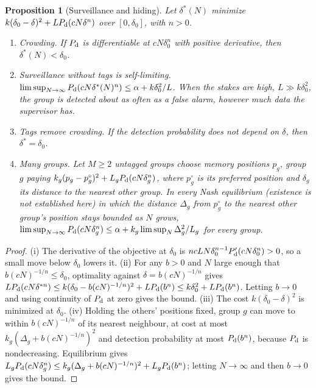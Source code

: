 \documentclass[12pt]{article}
\newtheorem{proposition}[theorem]{Proposition}
\theoremstyle{definition}
\theoremstyle{remark}
\begin{document}
\begin{proposition}[Surveillance and hiding]\label{prop:hidegame}
Let $\delta^*(N)$ minimize $k(\delta_0-\delta)^2+LP_{\rm d}(cN\delta^n)$ over $[0,\delta_0]$, with $n>0$.
\begin{enumerate}[label=(\roman*),itemsep=1pt]
\item \emph{Crowding.} If $P_{\rm d}$ is differentiable at $cN\delta_0^n$ with positive derivative, then $\delta^*(N)<\delta_0$.
\item \emph{Surveillance without tags is self-limiting.} $\limsup_{N\to\infty}P_{\rm d}(cN\delta^*(N)^n)\le\alpha+k\delta_0^2/L$. When the stakes are high, $L\gg k\delta_0^2$, the group is detected about as often as a false alarm, however much data the supervisor has.
\item \emph{Tags remove crowding.} If the detection probability does not depend on $\delta$, then $\delta^*=\delta_0$.
\item \emph{Many groups.} Let $M\ge2$ untagged groups choose memory positions $p_g$, group $g$ paying $k_g(p_g-p^\circ_g)^2+L_gP_{\rm d}(cN\delta_g^n)$, where $p^\circ_g$ is its preferred position and $\delta_g$ its distance to the nearest other group. In every Nash equilibrium (existence is not established here) in which the distance $\Delta_g$ from $p^\circ_g$ to the nearest other group's position stays bounded as $N$ grows, $\limsup_{N\to\infty}P_{\rm d}(cN\delta_g^n)\le\alpha+k_g\limsup_N\Delta_g^2/L_g$ for every group.
\end{enumerate}
\end{proposition}

\begin{proof}
(i) The derivative of the objective at $\delta_0$ is $ncLN\delta_0^{n-1}P_{\rm d}'(cN\delta_0^n)>0$, so a small move below $\delta_0$ lowers it. (ii) For any $b>0$ and $N$ large enough that $b(cN)^{-1/n}\le\delta_0$, optimality against $\delta=b(cN)^{-1/n}$ gives $LP_{\rm d}(cN\delta^{*n})\le k(\delta_0-b(cN)^{-1/n})^2+LP_{\rm d}(b^n)\le k\delta_0^2+LP_{\rm d}(b^n)$. Letting $b\to0$ and using continuity of $P_{\rm d}$ at zero gives the bound. (iii) The cost $k(\delta_0-\delta)^2$ is minimized at $\delta_0$. (iv) Holding the others' positions fixed, group $g$ can move to within $b(cN)^{-1/n}$ of its nearest neighbour, at cost at most $k_g(\Delta_g+b(cN)^{-1/n})^2$ and detection probability at most $P_{\rm d}(b^n)$, because $P_{\rm d}$ is nondecreasing. Equilibrium gives $L_gP_{\rm d}(cN\delta_g^n)\le k_g(\Delta_g+b(cN)^{-1/n})^2+L_gP_{\rm d}(b^n)$; letting $N\to\infty$ and then $b\to0$ gives the bound.
\end{proof}
\end{document}
